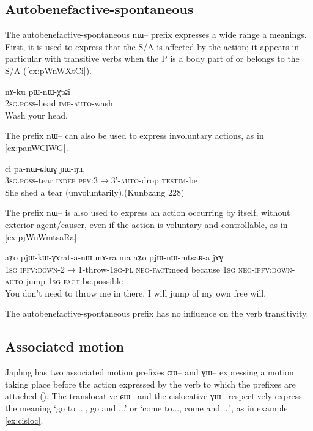 \documentclass[oldfontcommands,oneside,a4paper,11pt]{article}
\newcommand{\ipa}[1]{{\phon #1}} %
\begin{document}
\subsection{Autobenefactive-spontaneous}

The autobenefactive-spontaneous \ipa{nɯ--} prefix expresses a wide range a meanings. First, it is used to express that the S/A is affected by the action; it appears in particular with transitive verbs when the P is a body part of or belongs to the S/A (\ref{ex:pWnWXtCi}).

\begin{exe}
\ex \label{ex:pWnWXtCi}
\gll 
\ipa{nɤ-ku} 	\ipa{pɯ-nɯ-χtɕi} \\
\textsc{2sg.poss}-head \textsc{imp-auto}-wash \\
\glt Wash your head.
\end{exe}

The prefix \ipa{nɯ--} can also be used to express involuntary actions, as in \ref{ex:panWClWG}.

\begin{exe}
\ex \label{ex:panWClWG}
\gll \ipa{ɯ-qom} 	\ipa{ci} 	\ipa{pa-nɯ-ɕlɯɣ} 	\ipa{ɲɯ-ŋu,} \\
\textsc{3sg.poss}-tear \textsc{indef} \textsc{pfv:3$\rightarrow$3'-auto}-drop \textsc{testim}-be \\
\glt She shed a tear (unvoluntarily).(Kunbzang 228)
\end{exe}


The prefix \ipa{nɯ--} is also used to express an action occurring by itself, without exterior agent/causer, even if the action is voluntary and controllable, as in \ref{ex:pjWnWmtsaRa}.

\begin{exe}
\ex \label{ex:pjWnWmtsaRa}
\gll 
\ipa{aʑo} 	\ipa{pjɯ-kɯ-ɣɤrat-a-nɯ} 	\ipa{mɤ-ra} 	\ipa{ma} 	\ipa{aʑo} 	\ipa{pjɯ-nɯ-mtsaʁ-a} 	\ipa{jɤɣ} \\
\textsc{1sg} \textsc{ipfv:down}-2$\rightarrow$1-throw-\textsc{1sg-pl} \textsc{neg-fact}:need because \textsc{1sg} \textsc{neg-ipfv:down-auto}-jump-\textsc{1sg} \textsc{fact}:be.possible \\
\glt You don't need to throw me in there, I will jump of my own free will.
\end{exe}

The autobenefactive-spontaneous prefix has no influence on the verb transitivity.

\subsection{Associated motion}
Japhug has two associated motion prefixes \ipa{ɕɯ--} and \ipa{ɣɯ--} expressing a motion taking place before the action expressed by the verb to which the prefixes are attached 
(\citealt{jacques13harmonization}). The translocative \ipa{ɕɯ--} and the cislocative \ipa{ɣɯ--} respectively express the meaning `go to ..., go and ...' or `come to..., come and ...', as in example \ref{ex:cisloc}.
\end{document}
